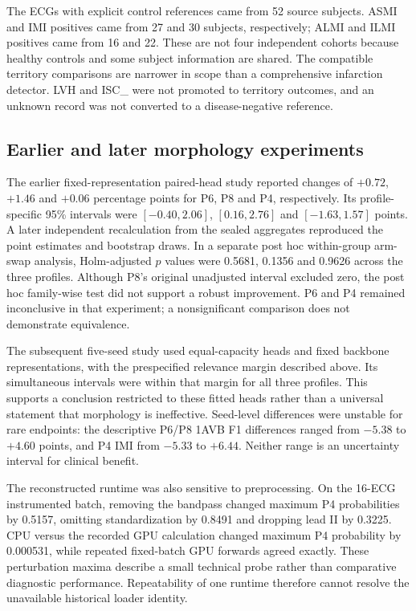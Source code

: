 The ECGs with explicit control references came from 52 source subjects. ASMI and IMI positives came from 27 and 30 subjects, respectively; ALMI and ILMI positives came from 16 and 22. These are not four independent cohorts because healthy controls and some subject information are shared. The compatible territory comparisons are narrower in scope than a comprehensive infarction detector. LVH and ISC\_ were not promoted to territory outcomes, and an unknown record was not converted to a disease-negative reference.

\subsection{Earlier and later morphology experiments}
\label{sec:morph-history}
The earlier fixed-representation paired-head study reported changes of $+0.72$, $+1.46$ and $+0.06$ percentage points for P6, P8 and P4, respectively. Its profile-specific 95\% intervals were $[-0.40,2.06]$, $[0.16,2.76]$ and $[-1.63,1.57]$ points. A later independent recalculation from the sealed aggregates reproduced the point estimates and bootstrap draws. In a separate post hoc within-group arm-swap analysis, Holm-adjusted $p$ values were 0.5681, 0.1356 and 0.9626 across the three profiles. Although P8's original unadjusted interval excluded zero, the post hoc family-wise test did not support a robust improvement. P6 and P4 remained inconclusive in that experiment; a nonsignificant comparison does not demonstrate equivalence.

The subsequent five-seed study used equal-capacity heads and fixed backbone representations, with the prespecified relevance margin described above. Its simultaneous intervals were within that margin for all three profiles. This supports a conclusion restricted to these fitted heads rather than a universal statement that morphology is ineffective. Seed-level differences were unstable for rare endpoints: the descriptive P6/P8 1AVB F1 differences ranged from $-5.38$ to $+4.60$ points, and P4 IMI from $-5.33$ to $+6.44$. Neither range is an uncertainty interval for clinical benefit.

The reconstructed runtime was also sensitive to preprocessing. On the 16-ECG instrumented batch, removing the bandpass changed maximum P4 probabilities by 0.5157, omitting standardization by 0.8491 and dropping lead II by 0.3225. CPU versus the recorded GPU calculation changed maximum P4 probability by 0.000531, while repeated fixed-batch GPU forwards agreed exactly. These perturbation maxima describe a small technical probe rather than comparative diagnostic performance. Repeatability of one runtime therefore cannot resolve the unavailable historical loader identity.
